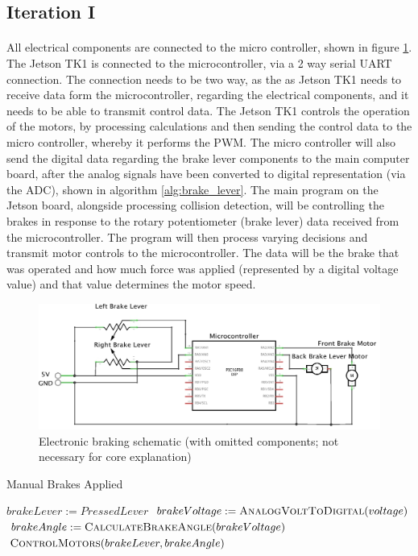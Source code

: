 \documentclass[a4paper]{report}
\begin{document}
{\subsection{Iteration I}

\paragraph{}All electrical components are connected to the micro controller, shown in figure \ref{fig:braking_schematic}. The Jetson TK1 is connected to the microcontroller, via a 2 way serial UART connection. The connection needs to be two way, as the as Jetson TK1 needs to receive data form the microcontroller, regarding the electrical components, and it needs to be able to transmit control data. The Jetson TK1 controls the operation of the motors, by processing calculations and then sending the control data to the micro controller, whereby it performs the PWM. The micro controller will also send the digital data regarding the brake lever components to the main computer board, after the analog signals have been converted to digital representation (via the ADC), shown in algorithm \ref{alg:brake_lever}. The main program on the Jetson board, alongside processing collision detection, will be controlling the brakes in response to the rotary potentiometer (brake lever) data received from the microcontroller. The program will then process varying decisions and transmit motor controls to the microcontroller. The data will be the brake that was operated and how much force was applied (represented by a digital voltage value) and that value determines the motor speed. 


\begin{figure}[h]
\centering
\includegraphics[scale=0.3]{figures/electronic_braking/circuit}
\caption{Electronic braking schematic (with omitted components; not necessary for core explanation)}
\label{fig:braking_schematic}
\end{figure}

\begin{algorithm}[h]
\caption{Manual Brakes Applied}\label{lag:brake}
\begin{algorithmic}[1]
\State $brakeLever := PressedLever$
\State $brakeVoltage := \Call{AnalogVoltToDigital}{voltage}$
\State $brakeAngle := \Call{CalculateBrakeAngle}{brakeVoltage}$
\State $\Call{ControlMotors}{brakeLever, brakeAngle}$
\end{algorithmic}
\end{algorithm}

}
\end{document}
